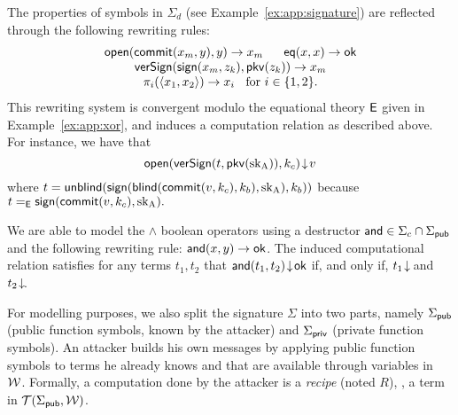 \begin{example}
\label{ex:app:rewriting-ap-ap}
The properties of 
symbols in $\Sigma_d$ (see Example~\ref{ex:app:signature})
are reflected through the
following rewriting rules:
\[
\begin{array}{c}
\mathsf{open}(\mathsf{commit}(x_m,y),y) \to x_m
\;\;\;\;\;\;
\mathsf{eq}(x,x) \to \mathsf{ok}\\
\mathsf{verSign}(\mathsf{sign}(x_m,z_k),\mathsf{pkv}(z_k)) \to x_m\\
\pi_i(\langle x_1,x_2\rangle) \to x_i \;\;\mbox{ for $i \in \{1,2\}$.} 
\end{array}
\]
This rewriting system is convergent modulo the equational theory $\mathsf{E}$
given in Example~\ref{ex:app:xor}, and induces a computation relation as described above.
For instance, we have that
$$\mathsf{open}(
  \mathsf{verSign}( 
    t,
     \mathsf{pkv}(\mathrm{sk_A})
  ),
  k_c)\!\downarrow\! v
$$
where $t=     \mathsf{unblind}(
        \mathsf{sign}(
           \mathsf{blind}(
              \mathsf{commit}(v,k_c),
               k_b
           ),
           \mathrm{sk_A}
        ),
        k_b)
     )$
because 
$t=_{\mathsf{E}}\mathsf{sign}(\mathsf{commit}(v,k_c),\mathrm{sk_A}).$
\end{example}

\begin{example}
\label{ex:app:rewriting-AND-ap}
We are able to model the $\land$ boolean operators using a destructor
$\mathsf{and}\in\Sigma_c\cap\Sigma_{\mathsf{pub}}$ and the following rewriting rule:
$\mathsf{and}(x,y)\to \mathsf{ok}$.
The induced computational relation satisfies for any terms $t_1,t_2$ that
$\mathsf{and}(t_1,t_2)\!\downarrow\! \mathsf{ok}$ if, and only if,
$t_1\!\downarrow\!$ and $t_2\!\downarrow\!$.
\end{example}



For modelling purposes, we also split the signature $\Sigma$ into two
parts, namely $\Sigma_{\mathsf{pub}}$ (public function symbols, known
by the attacker) and $\Sigma_{\mathsf{priv}}$ (private function symbols).
An attacker builds his own messages by applying public function symbols to
terms he already knows and that are available through variables
in~$\mathcal{W}$. Formally, a computation done by the attacker is a
\emph{recipe} (noted $R$), \ie, a term in $\mathcal{T}(\Sigma_{\mathsf{pub}},\mathcal{W})$.

